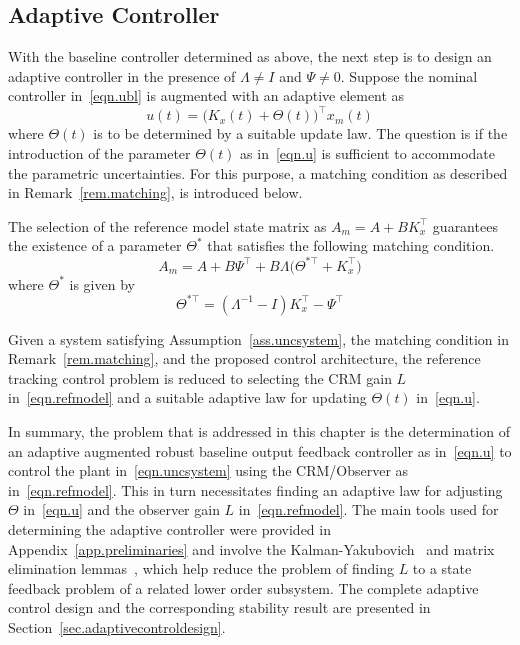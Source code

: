 \subsection{Adaptive Controller}

With the baseline controller determined as above, the next step is to design an adaptive controller in the presence of $\Lambda\neq I$ and $\Psi\neq 0$.
Suppose the nominal controller in\ \eqref{eqn.ubl} is augmented with an adaptive element as
\begin{equation}
  \label{eqn.u}
  u(t) = \bigr(K_{x}(t)+\Theta(t)\bigr)^{\top}x_{m}(t)
\end{equation}
where $\Theta(t)$ is to be determined by a suitable update law.
The question is if the introduction of the parameter $\Theta(t)$ as in\ \eqref{eqn.u} is sufficient to accommodate the parametric uncertainties.
For this purpose, a matching condition as described in Remark~\ref{rem.matching}, is introduced below.

\begin{rem-dan}\label{rem.matching}
  The selection of the reference model state matrix as $A_{m}=A+BK_{x}^{\top}$ guarantees the existence of a parameter $\Theta^{*}$ that satisfies the following matching condition.
  \begin{equation*}
    A_{m}=A+B\Psi^{\top}+B\Lambda\bigr(\Theta^{*\top}+K_{x}^{\top}\bigr)
  \end{equation*}
  where $\Theta^{*}$ is given by
  \begin{equation*}
    \Theta^{*\top}=(\Lambda^{-1}-I)K_{x}^{\top}-\Psi^{\top}
  \end{equation*}
\end{rem-dan}

Given a system satisfying Assumption~\ref{ass.uncsystem}, the matching condition in Remark~\ref{rem.matching}, and the proposed control architecture, the reference tracking control problem is reduced to selecting the CRM gain $L$ in\ \eqref{eqn.refmodel} and a suitable adaptive law for updating $\Theta(t)$ in\ \eqref{eqn.u}.

In summary, the problem that is addressed in this chapter is the determination of an adaptive augmented robust baseline output feedback controller as in\ \eqref{eqn.u} to control the plant in\ \eqref{eqn.uncsystem} using the CRM/Observer as in\ \eqref{eqn.refmodel}.
This in turn necessitates finding an adaptive law for adjusting $\Theta$ in\ \eqref{eqn.u} and the observer gain $L$ in\ \eqref{eqn.refmodel}.
The main tools used for determining the adaptive controller were provided in Appendix~\ref{app.preliminaries} and involve the Kalman-Yakubovich\ \cite{narendra.stable.2005} and matrix elimination lemmas\ \cite{boyd.lmibook.1994}, which help reduce the problem of finding $L$ to a state feedback problem of a related lower order subsystem.
The complete adaptive control design and the corresponding stability result are presented in Section~\ref{sec.adaptivecontroldesign}.

